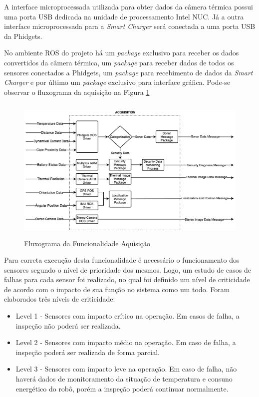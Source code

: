 A interface microprocessada utilizada para obter dados da câmera térmica possui uma porta USB dedicada na unidade de processamento Intel NUC. Já a outra interface microprocessada para a \textit{Smart Charger} será conectada a uma porta USB da Phidgets.

No ambiente ROS do projeto há um \textit{package} exclusivo para receber os dados convertidos da câmera térmica, um \textit{package} para receber dados de todos os sensores conectados a Phidgets, um \textit{package} para recebimento de dados da \textit{Smart Charger} e por último um \textit{package} exclusivo para interface gráfica. 
Pode-se observar o fluxograma da aquisição na Figura \ref{FuncAquisition}

\begin{figure}[!ht]
	\centering
	\includegraphics[height=7cm, width=14cm]{Figures/Fluxograma_Aquisition.jpg}
	\caption{Fluxograma da Funcionalidade Aquisição} \label{FuncAquisition}
\end{figure}

Para correta execução desta funcionalidade é necessário o funcionamento dos sensores segundo o nível de prioridade dos mesmos. Logo, um estudo de casos de falhas para cada sensor foi realizado, no qual foi definido um nível de criticidade de acordo com o impacto de sua função no sistema como um todo. Foram elaborados três níveis de criticidade:
\begin{itemize}
	\item Level 1 - Sensores com impacto crítico na operação. Em casos de falha, a inspeção não poderá ser realizada.
	\item Level 2 - Sensores com impacto médio na operação. Em caso de falha, a inspeção poderá ser realizada de forma parcial.
	\item Level 3 - Sensores com impacto leve na operação. Em caso de falha, não haverá dados de monitoramento da situação de temperatura e consuno energético do robô, porém a inspeção poderá continuar normalmente.
\end{itemize}

